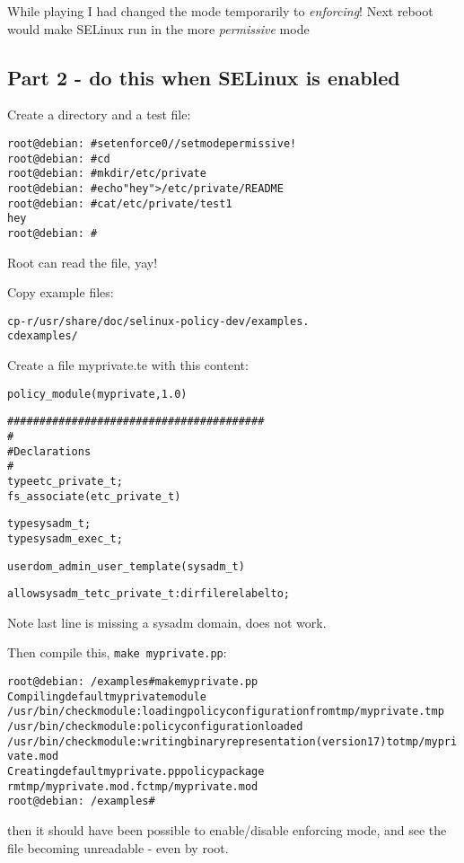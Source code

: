 \documentclass[a4paper,11pt,notitlepage]{report}
\begin{document}
While playing I had changed the mode temporarily to \emph{enforcing}! Next reboot would make SELinux run in the more \emph{permissive} mode

\subsection{Part 2 - do this when SELinux is enabled}

Create a directory and a test file:
\begin{alltt}
root@debian:~# setenforce 0   // set mode permissive!
root@debian:~# cd
root@debian:~# mkdir /etc/private
root@debian:~# echo "hey" > /etc/private/README
root@debian:~# cat /etc/private/test1
hey
root@debian:~#
\end{alltt}

Root can read the file, yay!

Copy example files:
\begin{alltt}
cp -r /usr/share/doc/selinux-policy-dev/examples .
cd examples/

\end{alltt}

Create a file myprivate.te with this content:
\begin{alltt}
policy_module(myprivate, 1.0)

########################################
#
# Declarations
#
type etc_private_t;
fs_associate(etc_private_t)

type sysadm_t;
type sysadm_exec_t;

userdom_admin_user_template(sysadm_t)

allow sysadm_t etc_private_t:{dir file} relabelto;
\end{alltt}

Note last line is missing a sysadm domain, does not work.

Then compile this, \verb+make myprivate.pp+:
\begin{alltt}
root@debian:~/examples# make myprivate.pp
Compiling default myprivate module
/usr/bin/checkmodule:  loading policy configuration from tmp/myprivate.tmp
/usr/bin/checkmodule:  policy configuration loaded
/usr/bin/checkmodule:  writing binary representation (version 17) to tmp/myprivate.mod
Creating default myprivate.pp policy package
rm tmp/myprivate.mod.fc tmp/myprivate.mod
root@debian:~/examples#
\end{alltt}

then it should have been possible to enable/disable enforcing mode, and see the file becoming unreadable - even by root.
\end{document}
